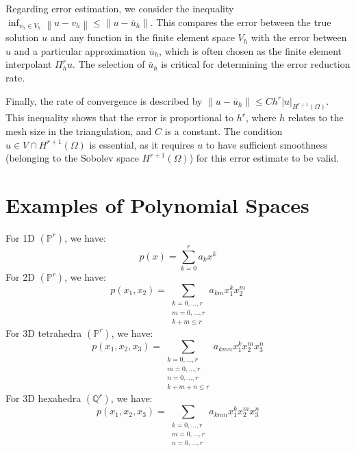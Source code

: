 \documentclass[11pt]{book}
\begin{document}
Regarding error estimation, we consider the inequality \( \inf _{v_{h} \in V_{h}}\left\|u-v_{h}\right\| \leq\left\|u-\bar{u}_{h}\right\| \). This compares the error between the true solution \( u \) and any function in the finite element space \( V_h \) with the error between \( u \) and a particular approximation \( \bar{u}_h \), which is often chosen as the finite element interpolant \( \Pi_h^r u \). The selection of \( \bar{u}_h \) is critical for determining the error reduction rate.

Finally, the rate of convergence is described by \( \left\|u-\bar{u}_{h}\right\| \leq C h^{r}|u|_{H^{r+1}(\Omega)} \). This inequality shows that the error is proportional to \( h^r \), where \( h \) relates to the mesh size in the triangulation, and \( C \) is a constant. The condition \( u \in V \cap H^{r+1}(\Omega) \) is essential, as it requires \( u \) to have sufficient smoothness (belonging to the Sobolev space \( H^{r+1}(\Omega) \)) for this error estimate to be valid.
\section*{Examples of Polynomial Spaces}
\textbullet \quad For 1D $\left(\mathbb{P}^{r}\right)$, we have:
\begin{equation*}
p(x)=\sum_{k=0}^{r} a_{k} x^{k}
\end{equation*}
\textbullet \quad For 2D $\left(\mathbb{P}^{r}\right)$, we have:
\begin{equation*}
p\left(x_{1}, x_{2}\right)=\sum_{\substack{k=0, \ldots, r \\ m=0, \ldots, r \\ k+m \leq r}} a_{k m} x_{1}^{k} x_{2}^{m}
\end{equation*}
\textbullet \quad For 3D tetrahedra $\left(\mathbb{P}^{r}\right)$, we have:
\begin{equation*}
p\left(x_{1}, x_{2}, x_{3}\right)=\sum_{\begin{array}{c}
k=0, \ldots, r \\
m=0, \ldots, r \\
n=0, \ldots, r \\
k+m+n \leq r
\end{array}} a_{k m n} x_{1}^{k} x_{2}^{m} x_{3}^{n}
\end{equation*}
\textbullet \quad For 3D hexahedra $\left(\mathbb{Q}^{r}\right)$, we have:
\begin{equation*}
p\left(x_{1}, x_{2}, x_{3}\right)=\sum_{\substack{k=0, \ldots, r \\ m=0, \ldots, r \\ n=0, \ldots, r}} a_{k m n} x_{1}^{k} x_{2}^{m} x_{3}^{n}
\end{equation*}
\end{document}
